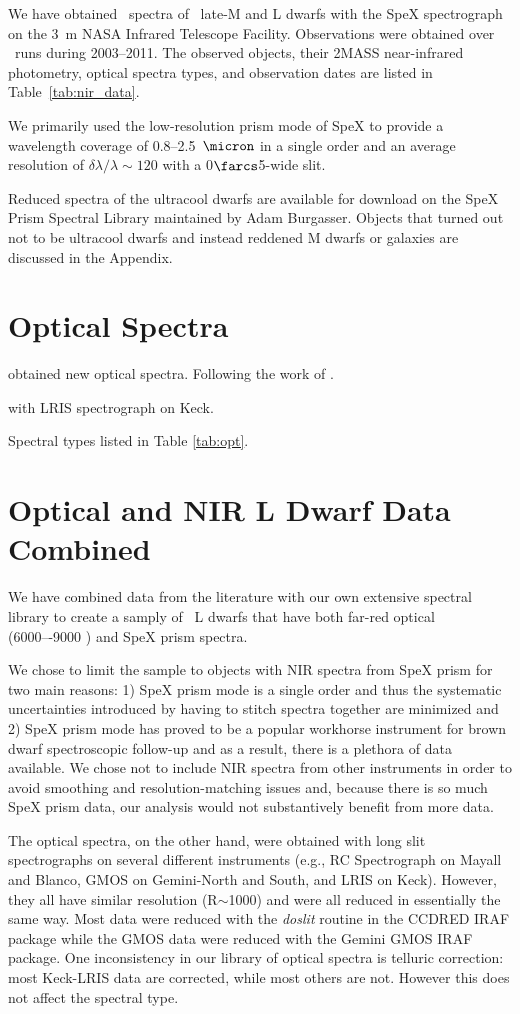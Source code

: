 \documentclass[12pt,preprint]{aastex}
\begin{document}
We have obtained \spectra~spectra of \objects~late-M and L dwarfs with the SpeX spectrograph \citep{Spex} on the 3~m NASA Infrared Telescope Facility. Observations were obtained over \runs~runs during 2003--2011. The observed objects, their 2MASS near-infrared photometry, optical spectra types, and observation dates are listed in Table~\ref{tab:nir_data}. 

We primarily used the low-resolution prism mode of SpeX to provide a wavelength coverage of 0.8--2.5~$\micron$ in a single order and an average resolution of $\delta\lambda/\lambda\sim120$ with a 0$\farcs$5-wide slit. 

Reduced spectra of the ultracool dwarfs are available for download on the SpeX Prism Spectral Library maintained by Adam Burgasser. Objects that turned out not to be ultracool dwarfs and instead reddened M dwarfs or galaxies are discussed in the Appendix.

\section{Optical Spectra}
obtained new optical spectra.
Following the work of \cite{cruz09_lowg}. 

with LRIS spectrograph on Keck.

Spectral types listed in Table \ref{tab:opt}.

\section{Optical and NIR L Dwarf Data Combined}

We have combined data from the literature with our own extensive spectral library to create a samply of \sample~L dwarfs that have both far-red optical (6000–-9000 \A) and SpeX prism spectra.

We chose to limit the sample to objects with NIR spectra from SpeX prism for two main reasons: 1) SpeX prism mode is a single order and thus the systematic uncertainties introduced by having to stitch spectra together are minimized and 2) SpeX prism mode has proved to be a popular workhorse instrument for brown dwarf spectroscopic follow-up and as a result, there is a plethora of data available. We chose not to include NIR spectra from other instruments in order  to avoid smoothing and resolution-matching issues and, because there is so much SpeX prism data, our analysis would not substantively benefit from more data.

The optical spectra, on the other hand, were obtained with long slit spectrographs on several different instruments (e.g., RC Spectrograph on Mayall and Blanco, GMOS on Gemini-North and South, and LRIS on Keck). However, they all have similar resolution (R$\sim$1000) and were all reduced in essentially the same way. Most data were reduced with the \emph{doslit} routine in the CCDRED IRAF package while the GMOS data were reduced with the Gemini GMOS IRAF package. One inconsistency in our library of optical spectra is telluric correction: most Keck-LRIS data are corrected, while most others are not. However this does not affect the spectral type.
\end{document}
